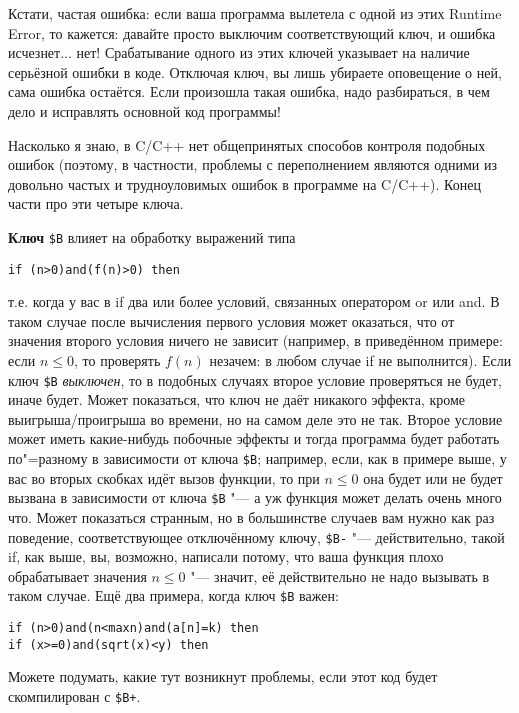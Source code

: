 Кстати, частая ошибка: если ваша программа вылетела с одной из этих Runtime Error, то кажется: 
давайте просто выключим соответствующий ключ, и ошибка исчезнет... нет! Срабатывание одного из этих 
ключей указывает на наличие серьёзной ошибки в коде. Отключая ключ, вы лишь убираете оповещение о 
ней, сама ошибка остаётся. Если произошла такая ошибка, надо разбираться, в чем дело и исправлять 
основной код программы!

Насколько я знаю, в C/C++ нет общепринятых способов контроля подобных ошибок (поэтому, в частности, 
проблемы с переполнением являются одними из довольно частых и трудноуловимых ошибок в программе на 
C/C++). Конец части про эти четыре ключа.

\textbf{Ключ} \verb|$B| влияет на обработку выражений типа
\begin{codesampleo}\begin{verbatim}
if (n>0)and(f(n)>0) then
\end{verbatim}\end{codesampleo}
т.е. когда у вас в if два или более условий, связанных оператором or или and. В таком случае после 
вычисления первого условия может оказаться, что от значения второго условия ничего не зависит 
(например, в приведённом примере: если $n\leq0$, то проверять $f(n)$ незачем: в любом случае if не 
выполнится). Если ключ \verb|$B| \textit{выключен}, то в подобных случаях второе условие 
проверяться не будет, иначе будет. Может показаться, что ключ не даёт никакого эффекта, кроме 
выигрыша/проигрыша во времени, но на самом деле это не так. Второе условие может иметь какие-нибудь 
побочные эффекты и тогда программа будет работать по"=разному в зависимости от ключа \verb|$B|; 
например, если, как в примере выше, у вас во вторых скобках идёт вызов функции, то при $n\leq0$ она 
будет или не будет вызвана в зависимости от ключа \verb|$B| "--- а уж функция может делать очень 
много что. Может показаться странным, но в большинстве случаев вам нужно как раз поведение, 
соответствующее отключённому ключу, \verb|$B-| "--- действительно, такой if, как выше, вы, 
возможно, написали потому, что ваша функция плохо обрабатывает значения $n\leq0$ "--- значит, её 
действительно не надо вызывать в таком случае. Ещё два примера, когда ключ \verb|$B| важен:
\begin{codesample}\begin{verbatim}
if (n>0)and(n<maxn)and(a[n]=k) then
if (x>=0)and(sqrt(x)<y) then
\end{verbatim}\end{codesample}
Можете подумать, какие тут возникнут проблемы, если этот код будет скомпилирован с \verb|$B+|.

